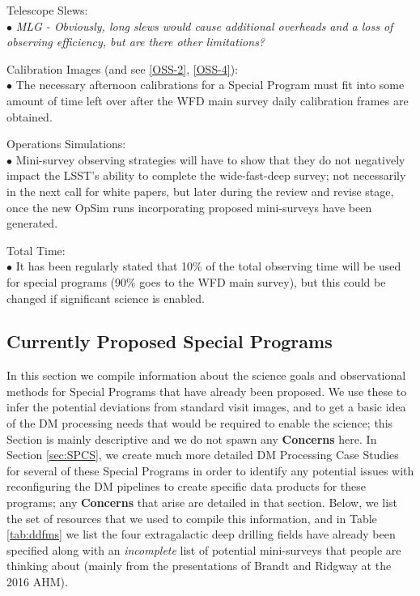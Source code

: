 \documentclass[DM,lsstdraft,toc]{lsstdoc}
\begin{document}
Telescope Slews: \\
$\bullet$ \textit{MLG - Obviously, long slews would cause additional overheads and a loss of observing efficiency, but are there other limitations?}

Calibration Images (and see \ref{OSS-2}, \ref{OSS-4}): \\
$\bullet$ The necessary afternoon calibrations for a Special Program must fit into some amount of time left over after the WFD main survey daily calibration frames are obtained.

Operations Simulations: \\
$\bullet$ Mini-survey observing strategies will have to show that they do not negatively impact the LSST's ability to complete the wide-fast-deep survey; not necessarily in the next call for white papers, but later during the review and revise stage, once the new OpSim runs incorporating proposed mini-surveys have been generated.

Total Time: \\
$\bullet$ It has been regularly stated that 10\% of the total observing time will be used for special programs (90\% goes to the WFD main survey), but this could be changed if significant science is enabled. \\



\subsection{Currently Proposed Special Programs} \label{ssec:data_science}

In this section we compile information about the science goals and observational methods for Special Programs that have already been proposed. We use these to infer the potential deviations from standard visit images, and to get a basic idea of the DM processing needs that would be required to enable the science; this Section is mainly descriptive and we do not spawn any {\bf Concerns} here. In Section \ref{sec:SPCS}, we create much more detailed DM Processing Case Studies for several of these Special Programs in order to identify any potential issues with reconfiguring the DM pipelines to create specific data products for these programs; any {\bf Concerns} that arise are detailed in that section. Below, we list the set of resources that we used to compile this information, and in Table \ref{tab:ddfms} we list the four extragalactic deep drilling fields have already been specified along with an {\it incomplete} list of potential mini-surveys that people are thinking about (mainly from the presentations of Brandt and Ridgway at the 2016 AHM).
\end{document}
